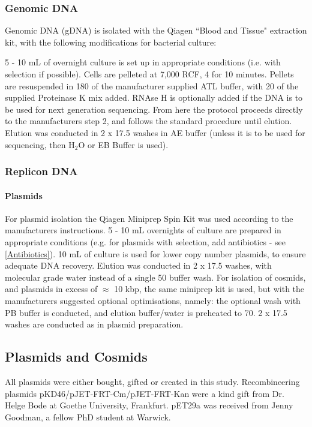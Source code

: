 	\subsubsection{Genomic DNA}\label{gdna}
		Genomic DNA (gDNA) is isolated with the Qiagen ``Blood and Tissue" extraction kit, with the following modifications for bacterial culture:

		 5 - 10 mL of overnight culture is set up in appropriate conditions (i.e. with selection if possible). Cells are pelleted at 7,000 RCF, 4\degC{} for 10 minutes. Pellets are resuspended in 180\ul{} of the manufacturer supplied ATL buffer, with 20\ul{} of the supplied Proteinase K mix added. RNAse H is optionally added if the DNA is to be used for next generation sequencing. From here the protocol proceeds directly to the manufacturers step 2, and follows the standard procedure until elution. Elution was conducted in 2 x 17.5\ul{} washes in AE buffer (unless it is to be used for sequencing, then H$_2$O or EB Buffer is used).

	\subsubsection{Replicon DNA}\label{Plasmids}
			\paragraph{Plasmids}
		For plasmid isolation the Qiagen Miniprep Spin Kit was used according to the manufacturers instructions. 5 - 10 mL overnights of culture are prepared in appropriate conditions (e.g. for plasmids with selection, add antibiotics - see \vref{Antibiotics}). 10 mL of culture is used for lower copy number plasmids, to ensure adequate DNA recovery. Elution was conducted in 2 x 17.5 \ul{} washes, with molecular grade water instead of a single 50 \ul{} buffer wash. For isolation of cosmids, and plasmids in excess of $\approx$ 10 kbp, the same miniprep kit is used, but with the manufacturers suggested optional optimisations, namely: the optional wash with PB buffer is conducted, and elution buffer/water is preheated to 70\degC. 2 x 17.5 \ul{} washes are conducted as in plasmid preparation.


	\subsection{Plasmids and Cosmids}
	All plasmids were either bought, gifted or created in this study. Recombineering plasmids pKD46/pJET-FRT-Cm/pJET-FRT-Kan were a kind gift from Dr. Helge Bode at Goethe University, Frankfurt. pET29a was received from Jenny Goodman, a fellow PhD student at Warwick.
	
